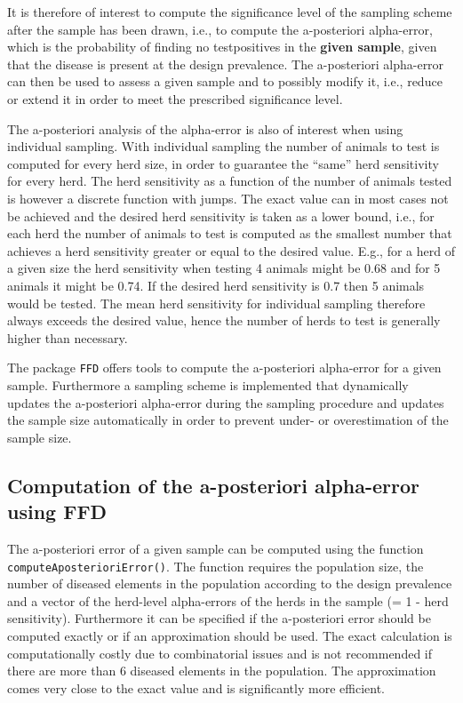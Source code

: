 \documentclass[nojss]{jss}
\begin{document}
It is therefore of interest to compute the significance level of the 
sampling scheme after the sample has been drawn, i.e., to compute 
the a-posteriori alpha-error, which is the probability of finding no 
testpositives in the \textbf{given sample}, given that the disease 
is present at the design prevalence. The a-posteriori alpha-error 
can then be used to assess a given sample and to possibly modify it, 
i.e., reduce or extend it in order to meet the prescribed 
significance level. 

The a-posteriori analysis of the alpha-error is also of interest 
when using individual sampling. With individual sampling the number 
of animals to test is computed for every herd size, in order to 
guarantee the ``same'' herd sensitivity for every herd. The herd 
sensitivity as a function of the number of animals tested is however 
a discrete function with jumps. The exact value can in most cases 
not be achieved and the desired herd sensitivity is taken as a lower 
bound, i.e., for each herd the number of animals to test is computed 
as the smallest number that achieves a herd sensitivity greater or 
equal to the desired value. E.g., for a herd of a given size the 
herd sensitivity when testing 4 animals might be 0.68 and for 5 
animals it might be 0.74. If the desired herd sensitivity is 0.7 
then 5 animals would be tested. The mean herd sensitivity for 
individual sampling therefore always exceeds the desired value, 
hence the number of herds to test is generally higher than 
necessary. 

The package \texttt{FFD} offers tools to compute the a-posteriori 
alpha-error for a given sample. Furthermore a sampling scheme is 
implemented that dynamically updates the a-posteriori alpha-error 
during the sampling procedure and updates the sample size 
automatically in order to prevent under- or overestimation of the 
sample size. 

\subsection{Computation of the a-posteriori alpha-error using FFD} 

The a-posteriori error of a given sample can be computed using the 
function \texttt{computeAposterioriError()}. 
 The function requires the 
population size, the number of diseased elements in the population 
according to the design prevalence and a vector of the herd-level 
alpha-errors of the herds in the sample (= 1 - herd sensitivity). 
Furthermore it can be specified if the a-posteriori error should be 
computed exactly or if an approximation should be used. The exact 
calculation is computationally costly due to combinatorial issues 
and is not recommended if there are more than 6 diseased elements in 
the population. The approximation comes very close to the exact 
value and is significantly more efficient. 
\end{document}
